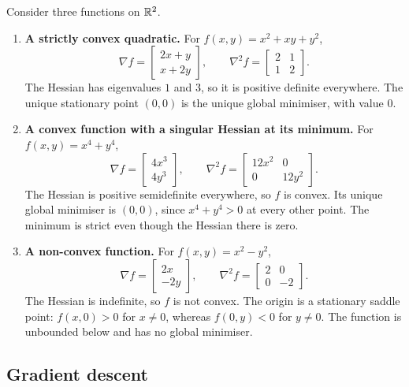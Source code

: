 \begin{example}
Consider three functions on $\mathbb{R}^2$.
\begin{enumerate}
    \item \textbf{A strictly convex quadratic.} For $f(x,y)=x^2+xy+y^2$,
    \[
        \nabla f=\begin{bmatrix}2x+y\\x+2y\end{bmatrix},
        \qquad\nabla^2 f=\begin{bmatrix}2&1\\1&2\end{bmatrix}.
    \]
    The Hessian has eigenvalues $1$ and $3$, so it is positive definite everywhere. The unique stationary point $(0,0)$ is the unique global minimiser, with value $0$.
    \item \textbf{A convex function with a singular Hessian at its minimum.} For $f(x,y)=x^4+y^4$,
    \[
        \nabla f=\begin{bmatrix}4x^3\\4y^3\end{bmatrix},
        \qquad\nabla^2 f=\begin{bmatrix}12x^2&0\\0&12y^2\end{bmatrix}.
    \]
    The Hessian is positive semidefinite everywhere, so $f$ is convex. Its unique global minimiser is $(0,0)$, since $x^4+y^4>0$ at every other point. The minimum is strict even though the Hessian there is zero.
    \item \textbf{A non-convex function.} For $f(x,y)=x^2-y^2$,
    \[
        \nabla f=\begin{bmatrix}2x\\-2y\end{bmatrix},
        \qquad\nabla^2 f=\begin{bmatrix}2&0\\0&-2\end{bmatrix}.
    \]
    The Hessian is indefinite, so $f$ is not convex. The origin is a stationary saddle point: $f(x,0)>0$ for $x\neq0$, whereas $f(0,y)<0$ for $y\neq0$. The function is unbounded below and has no global minimiser.
\end{enumerate}
\end{example}

\subsection{Gradient descent}
\label{sub:first_order_methods}

